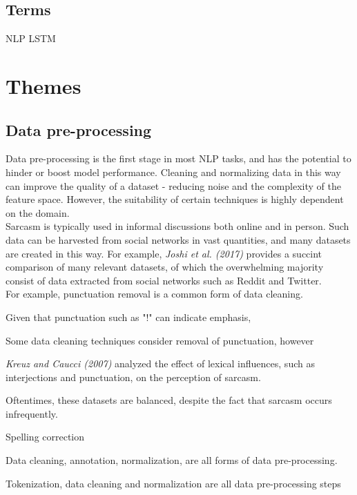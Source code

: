 \documentclass[12pt,a4paper]{article}
\begin{document}
\subsection{Terms}
NLP
LSTM

\newpage

\section{Themes}
\subsection{Data pre-processing}
\noindent Data pre-processing is the first stage in most NLP tasks, and has the potential to hinder or boost model performance. Cleaning and normalizing data in this way can improve the quality of a dataset - reducing noise and the complexity of the feature space. However, the suitability of certain techniques is highly dependent on the domain.\\

\noindent Sarcasm is typically used in informal discussions both online and in person. Such data can be harvested from social networks in vast quantities, and many datasets are created in this way. For example, \textit{Joshi et al. (2017)} \cite{joshi2017automatic} provides a succint comparison of many relevant datasets, of which the overwhelming majority consist of data extracted from social networks such as Reddit and Twitter. \\



For example, punctuation removal is a common form of data cleaning. 


Given that punctuation such as "!" can indicate emphasis, 

Some data cleaning techniques consider removal of punctuation, however 

\textit{Kreuz and Caucci (2007)} analyzed the effect of lexical influences, such as interjections and punctuation, on the perception of sarcasm.  

Oftentimes, these datasets are balanced, despite the fact that sarcasm occurs infrequently.



Spelling correction

Data cleaning, annotation, normalization, are all forms of data pre-processing. 



Tokenization, data cleaning and normalization are all data pre-processing steps 
\end{document}
